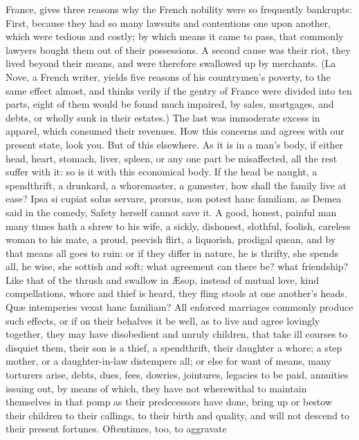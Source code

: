 {France, gives three reasons why the French nobility were so
frequently bankrupts: First, because they had so many lawsuits and
contentions one upon another, which were tedious and costly; by which
means it came to pass, that commonly lawyers bought them out of their
possessions. A second cause was their riot, they lived beyond their
means, and were therefore swallowed up by merchants. (La Nove, a French
writer, yields five reasons of his countrymen's poverty, to the same
effect almost, and thinks verily if the gentry of France were divided
into ten parts, eight of them would be found much impaired, by sales,
mortgages, and debts, or wholly sunk in their estates.) The last was
immoderate excess in apparel, which consumed their revenues. How this
concerns and agrees with our present state, look you. But of this
elsewhere. As it is in a man's body, if either head, heart, stomach,
liver, spleen, or any one part be misaffected, all the rest suffer with
it: so is it with this economical body. If the head be naught, a
spendthrift, a drunkard, a whoremaster, a gamester, how shall the
family live at ease? Ipsa si cupiat solus servare, prorsus, non
potest hanc familiam, as Demea said in the comedy, Safety herself
cannot save it. A good, honest, painful man many times hath a shrew to
his wife, a sickly, dishonest, slothful, foolish, careless woman to his
mate, a proud, peevish flirt, a liquorish, prodigal quean, and by that
means all goes to ruin: or if they differ in nature, he is thrifty, she
spends all, he wise, she sottish and soft; what agreement can there be?
what friendship? Like that of the thrush and swallow in \AE{}sop, instead
of mutual love, kind compellations, whore and thief is heard, they
fling stools at one another's heads. Qu\ae{} intemperies vexat hanc
familiam? All enforced marriages commonly produce such effects, or if
on their behalves it be well, as to live and agree lovingly together,
they may have disobedient and unruly children, that take ill courses to
disquiet them, their son is a thief, a spendthrift, their daughter
a whore; a step mother, or a daughter-in-law distempers all;
or else for want of means, many torturers arise, debts, dues,
fees, dowries, jointures, legacies to be paid, annuities issuing out,
by means of which, they have not wherewithal to maintain themselves in
that pomp as their predecessors have done, bring up or bestow their
children to their callings, to their birth and quality, and will
not descend to their present fortunes. Oftentimes, too, to aggravate
}
